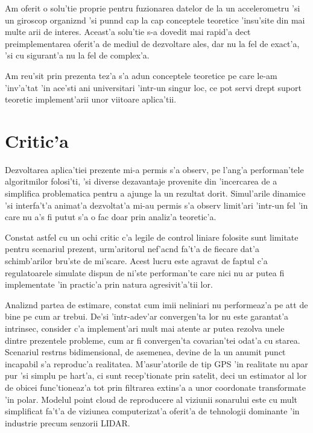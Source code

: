 \documentclass[12pt,a4paper,twoside]{report}
\begin{document}
\vspace{5px}

Am oferit o solu'tie proprie pentru fuzionarea datelor de la un accelerometru 'si un giroscop organiz\ia nd 'si pun\ia nd cap la cap conceptele teoretice 'insu'site din mai multe arii de interes. Aceast'a solu'tie s-a dovedit mai rapid'a dec\ia t preimplementarea oferit'a de mediul de dezvoltare ales, dar nu la fel de exact'a, 'si cu sigurant'a nu la fel de complex'a.

\vspace{5px}

Am reu'sit prin prezenta tez'a s'a adun conceptele teoretice pe care le-am 'inv'a'tat 'in ace'sti ani universitari 'intr-un singur loc, ce pot servi drept suport teoretic implement'arii unor viitoare aplica'tii.

\section{Critic'a}

Dezvoltarea aplica'tiei prezente mi-a permis s'a observ, pe l'ang'a performan'tele algoritmilor folosi'ti, 'si diverse dezavantaje provenite din 'incercarea de a simplifica problematica pentru a ajunge la un rezultat dorit. Simul'arile dinamice 'si interfa't'a animat'a dezvoltat'a mi-au permis s'a observ limit'ari 'intr-un fel 'in care nu a's fi putut s'a o fac doar prin analiz'a teoretic'a. 

\vspace{5px}

Constat astfel cu un ochi critic c'a legile de control liniare folosite sunt limitate pentru scenariul prezent, urm'aritorul nef'ac\ia nd fa't'a de fiecare dat'a schimb'arilor bru'ste de mi'scare. Acest lucru este agravat de faptul c'a regulatoarele simulate dispun de ni'ste performan'te care nici nu ar putea fi implementate 'in practic'a prin natura agresivit'a'tii lor.

\vspace{5px}

Analiz\ia nd partea de estimare, constat cum imii neliniari nu performeaz'a pe at\ia t de bine pe cum ar trebui. De'si 'intr-adev'ar convergen'ta lor nu este garantat'a intrinsec, consider c'a implement'ari mult mai atente ar putea rezolva unele dintre prezentele probleme, cum ar fi convergen'ta covarian'tei odat'a cu starea. Scenariul restr\ia ns bidimensional, de asemenea, devine de la un anumit punct incapabil s'a reproduc'a realitatea. M'asur'atorile de tip GPS 'in realitate nu apar pur 'si simplu pe hart'a, ci sunt recep'tionate prin satelit, deci un estimator al lor de obicei func'tioneaz'a tot prin filtrarea extins'a a unor coordonate transformate 'in polar. Modelul point cloud de reproducere al viziunii sonarului este cu mult simplificat fa't'a de viziunea computerizat'a oferit'a de tehnologii dominante 'in industrie precum senzorii LIDAR. 
\end{document}
